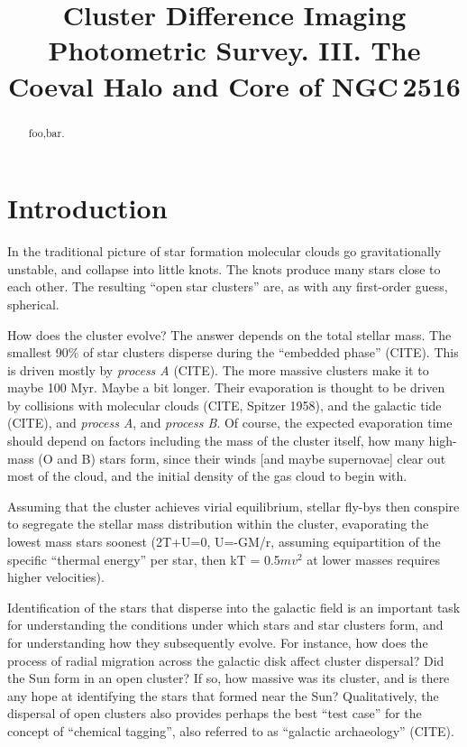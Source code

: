 \documentclass[12pt,twocolumn,tighten]{aastex63}
\begin{document}

\title{
  Cluster Difference Imaging Photometric Survey. III.
  The Coeval Halo and Core of NGC\,2516
}



\begin{abstract}
  foo,bar.
\end{abstract}




\section{Introduction}

In the traditional picture of star formation molecular clouds go
gravitationally unstable, and collapse into little knots.  The knots
produce many stars close to each other.  The resulting ``open star
clusters'' are, as with any first-order guess, spherical.

How does the cluster evolve?  The answer depends
on the total stellar mass.
The smallest 90\% of star clusters disperse during the ``embedded
phase'' (CITE).  This is driven mostly by {\it process A} (CITE).  The
more massive clusters make it to maybe 100 Myr. Maybe a bit longer.
Their evaporation is thought to be driven by collisions with molecular
clouds (CITE, Spitzer 1958), and the galactic tide (CITE), and {\it
process A}, and {\it process B}.  Of course, the expected evaporation
time should depend on factors including the mass of the cluster
itself, how many high-mass (O and B) stars form, since their winds
[and maybe supernovae] clear out most of the cloud, and the initial
density of the gas cloud to begin with.

Assuming that the cluster achieves virial equilibrium, stellar fly-bys
then conspire to segregate the stellar mass distribution within the
cluster, evaporating the lowest mass stars soonest (2T+U=0, U=-GM/r,
assuming equipartition of the specific ``thermal energy'' per star,
then kT = 0.5$mv^2$ at lower masses requires higher velocities).  

Identification of the stars that disperse into the galactic field is
an important task for understanding the conditions under which stars
and star clusters form, and for understanding how they subsequently
evolve.  For instance, how does the process of radial migration across
the galactic disk affect cluster dispersal?  Did the Sun form in an
open cluster? If so, how massive was its cluster, and is there any
hope at identifying the stars that formed near the Sun?
Qualitatively, the dispersal of open clusters also provides perhaps
the best ``test case'' for the concept of ``chemical tagging'', also
referred to as ``galactic archaeology'' (CITE).
\end{document}

